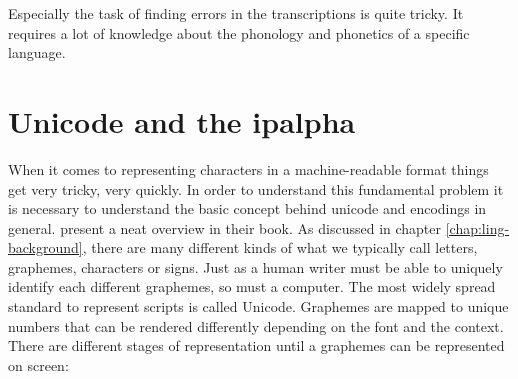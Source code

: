 Especially the task of finding errors in the transcriptions is quite tricky. It requires a lot of knowledge about the phonology and phonetics of a specific language. 

\section{Unicode and the \ac{ipalpha}}
When it comes to representing characters in a machine-readable format things get very tricky, very quickly. In order to understand this fundamental problem it is necessary to understand the basic concept behind unicode and encodings in general. \citet{unicode-lingu} present a neat overview in their book. As discussed in chapter \ref{chap:ling-background}, there are many different kinds of what we typically call letters, graphemes, characters or signs. Just as a human writer must be able to uniquely identify each different graphemes, so must a computer. The most widely spread standard to represent scripts is called Unicode. Graphemes are mapped to unique numbers that can be rendered differently depending on the font and the context. There are different stages of representation until a graphemes can be represented on screen:

